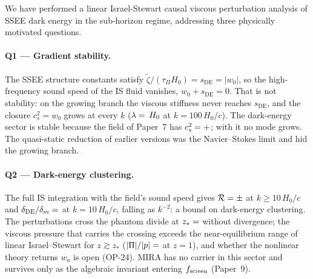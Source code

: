 \documentclass[12pt,a4paper]{article}
\newcommand{\wz}{w_0}
\newcommand{\sDE}{s_{\mathrm{DE}}}
\newcommand{\tauPi}{\tau_\Pi}
\newcommand{\ztilde}{\tilde{\zeta}}
\begin{document}
We have performed a linear Israel-Stewart causal viscous perturbation analysis
of SSEE dark energy in the sub-horizon regime, addressing three physically motivated questions.

\paragraph{Q1 --- Gradient stability.}
The SSEE structure constants satisfy $\ztilde/(\tauPi H_0) = \sDE = |\wz|$, so the
high-frequency sound speed of the IS fluid vanishes, $\wz+\sDE=0$. That is not
stability: on the growing branch the viscous stiffness never reaches $\sDE$, and the
closure $c^2_s=\wz$ grows at every $k$ ($\lambda=\val{p5_lamIS_k100}\,H_0$ at
$k=100\,H_0/c$). The dark-energy sector is stable because the field of Paper~7 has
$c^2_s=+\val{cs2_condensado_d6}$; with it no mode grows. The quasi-static reduction of
earlier versions was the Navier--Stokes limit and hid the growing branch.

\paragraph{Q2 --- Dark-energy clustering.}
The full IS integration with the field's sound speed gives
$\mathcal{R} = \val{R_media_k10_p5} \pm \val{R_sd_k10_p5}$ at $k\geq10\,H_0/c$ and
$\delta_{\rm DE}/\delta_m=\val{q2_r_k3}$ at $k=10\,H_0/c$, falling as $k^{-2}$: a bound on
dark-energy clustering. The perturbations cross the phantom divide at
$z_*=\val{z_cruce}$ without divergence; the viscous pressure that carries the crossing
exceeds the near-equilibrium range of linear Israel--Stewart for $z\gtrsim z_*$
($|\Pi|/|p|=\val{p5_Pip_z1}$ at $z=1$), and whether the nonlinear theory returns $w_a$
is open (OP-24). MIRA has no carrier in this sector and survives only as the
algebraic invariant entering $f_{\rm screen}$ (Paper~9).
\end{document}
